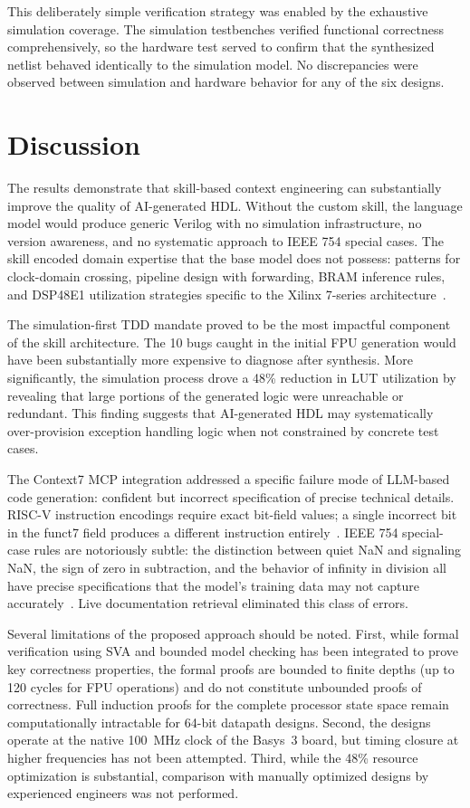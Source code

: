 \documentclass[journal]{IEEEtran}
\begin{document}
This deliberately simple verification strategy was enabled by the exhaustive simulation coverage. The simulation testbenches verified functional correctness comprehensively, so the hardware test served to confirm that the synthesized netlist behaved identically to the simulation model. No discrepancies were observed between simulation and hardware behavior for any of the six designs.

\section{Discussion}

The results demonstrate that skill-based context engineering can substantially improve the quality of AI-generated HDL. Without the custom skill, the language model would produce generic Verilog with no simulation infrastructure, no version awareness, and no systematic approach to IEEE 754 special cases. The skill encoded domain expertise that the base model does not possess: patterns for clock-domain crossing, pipeline design with forwarding, BRAM inference rules, and DSP48E1 utilization strategies specific to the Xilinx 7-series architecture~\cite{xilinx2020ds180}.

The simulation-first TDD mandate proved to be the most impactful component of the skill architecture. The 10 bugs caught in the initial FPU generation would have been substantially more expensive to diagnose after synthesis. More significantly, the simulation process drove a 48\% reduction in LUT utilization by revealing that large portions of the generated logic were unreachable or redundant. This finding suggests that AI-generated HDL may systematically over-provision exception handling logic when not constrained by concrete test cases.

The Context7 MCP integration addressed a specific failure mode of LLM-based code generation: confident but incorrect specification of precise technical details. RISC-V instruction encodings require exact bit-field values; a single incorrect bit in the funct7 field produces a different instruction entirely~\cite{waterman2019riscv}. IEEE 754 special-case rules are notoriously subtle: the distinction between quiet NaN and signaling NaN, the sign of zero in subtraction, and the behavior of infinity in division all have precise specifications that the model's training data may not capture accurately~\cite{ieee754_2019}. Live documentation retrieval eliminated this class of errors.

Several limitations of the proposed approach should be noted. First, while formal verification using SVA and bounded model checking has been integrated to prove key correctness properties, the formal proofs are bounded to finite depths (up to 120 cycles for FPU operations) and do not constitute unbounded proofs of correctness. Full induction proofs for the complete processor state space remain computationally intractable for 64-bit datapath designs. Second, the designs operate at the native 100~MHz clock of the Basys~3 board, but timing closure at higher frequencies has not been attempted. Third, while the 48\% resource optimization is substantial, comparison with manually optimized designs by experienced engineers was not performed.
\end{document}
